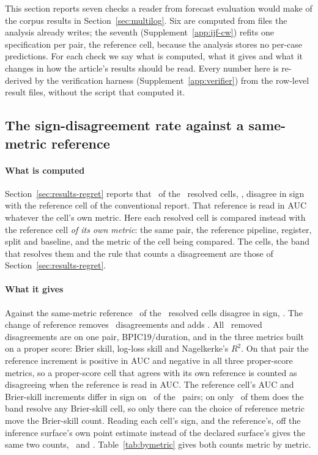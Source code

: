 This section reports seven checks a reader from forecast evaluation would make
of the corpus results in Section~\ref{sec:multilog}. Six are computed from
files the analysis already writes; the seventh
(Supplement~\ref{app:ijf-cw}) refits one specification per pair, the
reference cell, because the analysis stores no per-case predictions.
For each check we say what is computed, what it gives and what it changes in
how the article's results should be read. Every number here is re-derived by
the verification harness (Supplement~\ref{app:verifier}) from the row-level
result files, without the script that computed it.

\subsection{The sign-disagreement rate against a same-metric reference}
\label{app:ijf-samemetric}

\paragraph{What is computed}
Section~\ref{sec:results-regret} reports that \nDisagreeResolved\ of the
\nResolvedCorpus\ resolved cells, \misreportPooledResolvedPct, disagree in
sign with the reference cell of the conventional report. That reference is
read in AUC whatever the cell's own metric. Here each resolved cell is
compared instead with the reference cell \emph{of its own metric}: the same
pair, the reference pipeline, register, split and baseline, and the metric of the
cell being compared. The cells, the band that resolves them and the rule that
counts a disagreement are those of Section~\ref{sec:results-regret}.

\paragraph{What it gives}
Against the same-metric reference \nDisagreeOwnMetric\ of the
\nResolvedCorpus\ resolved cells disagree in sign, \misreportOwnMetricPct.
The change of reference removes \nLeaveOwnMetric\ disagreements and adds
\nEnterOwnMetric. All \nLeaveBpicNineteenProper\ removed disagreements are on
one pair,
BPIC19/duration, and in the three metrics built on a proper score: Brier
skill, log-loss skill and Nagelkerke's $R^2$. On that pair the reference
increment is positive in AUC and negative in all three proper-score metrics,
so a proper-score cell that agrees with its own reference is counted as
disagreeing when the reference is read in AUC. The reference cell's AUC and
Brier-skill increments differ in sign on \nPairsRefSignDiffersBrier\ of the
\nPairs\ pairs; on only \nPairsRefSignDiffersBrierResolved\ of them does the
band resolve any Brier-skill cell, so only there can the choice of reference
metric move the Brier-skill count. Reading each cell's sign, and the reference's, off the
inference surface's own point estimate instead of the declared surface's
gives the same two counts, \nDisagreeAucRefInferencePoint\ and
\nDisagreeOwnRefInferencePoint. Table~\ref{tab:bymetric} gives both counts
metric by metric.

